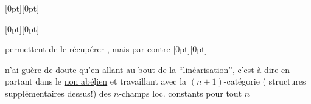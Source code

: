 \raisebox{0pt}[0pt][0pt]{\parbox{0pt}{}}
\raisebox{0pt}[0pt][0pt]{\parbox{0pt}{}}
permettent de le récupérer , mais par contre%
\raisebox{0pt}[0pt][0pt]{\parbox{0pt}{}}
n'ai guère de doute qu'en allant au bout de la ``linéarisation'', c'est à dire en partant dans le
\uline{non abé}l\uline{ien} et travaillant avec la $(n+1)$-catégorie ( structures supplémentaires dessus!) des $n$-champs loc. constants
 pour tout $n$
